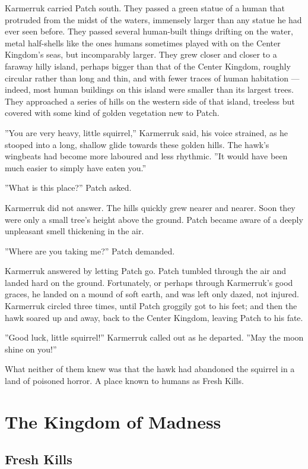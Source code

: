 \documentclass[12pt]{book}
\begin{document}
Karmerruk carried Patch south. They passed a green statue of a human
that protruded from the midst of the waters, immensely larger than any
statue he had ever seen before. They passed several human-built things
drifting on the water, metal half-shells like the ones humans
sometimes played with on the Center Kingdom's seas, but incomparably
larger. They grew closer and closer to a faraway hilly island, perhaps
bigger than that of the Center Kingdom, roughly circular rather than
long and thin, and with fewer traces of human habitation --- indeed,
most human buildings on this island were smaller than its largest
trees. They approached a series of hills on the western side of that
island, treeless but covered with some kind of golden vegetation new
to Patch.

''You are very heavy, little squirrel,'' Karmerruk said, his voice
strained, as he stooped into a long, shallow glide towards these
golden hills. The hawk's wingbeats had become more laboured and less
rhythmic. ''It would have been much easier to simply have eaten you.''

''What is this place?'' Patch asked.

Karmerruk did not answer. The hills quickly grew nearer and
nearer. Soon they were only a small tree's height above the
ground. Patch became aware of a deeply unpleasant smell thickening in
the air.

''Where are you taking me?'' Patch demanded.

Karmerruk answered by letting Patch go. Patch tumbled through the air
and landed hard on the ground. Fortunately, or perhaps through
Karmerruk's good graces, he landed on a mound of soft earth, and was
left only dazed, not injured. Karmerruk circled three times, until
Patch groggily got to his feet; and then the hawk soared up and away,
back to the Center Kingdom, leaving Patch to his fate.

''Good luck, little squirrel!'' Karmerruk called out as he
departed. ''May the moon shine on you!''

What neither of them knew was that the hawk had abandoned the squirrel
in a land of poisoned horror. A place known to humans as Fresh Kills.



\chapter{The Kingdom of Madness}

\section{Fresh Kills}
\end{document}
